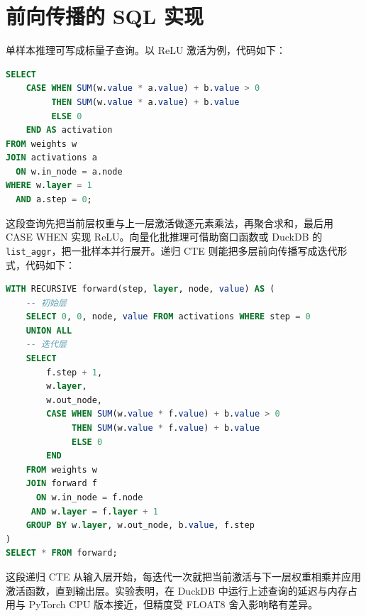 \chapter{前向传播的 SQL 实现}
单样本推理可写成标量子查询。以 ReLU 激活为例，代码如下：\par
\begin{lstlisting}[language=sql]
SELECT 
    CASE WHEN SUM(w.value * a.value) + b.value > 0 
         THEN SUM(w.value * a.value) + b.value 
         ELSE 0 
    END AS activation
FROM weights w
JOIN activations a 
  ON w.in_node = a.node 
WHERE w.layer = 1 
  AND a.step = 0;
\end{lstlisting}
这段查询先把当前层权重与上一层激活做逐元素乘法，再聚合求和，最后用 CASE WHEN 实现 ReLU。向量化批推理可借助窗口函数或 DuckDB 的 \texttt{list\_{}aggr}，把一批样本并行展开。递归 CTE 则能把多层前向传播写成迭代形式，代码如下：\par
\begin{lstlisting}[language=sql]
WITH RECURSIVE forward(step, layer, node, value) AS (
    -- 初始层
    SELECT 0, 0, node, value FROM activations WHERE step = 0
    UNION ALL
    -- 迭代层
    SELECT 
        f.step + 1,
        w.layer,
        w.out_node,
        CASE WHEN SUM(w.value * f.value) + b.value > 0 
             THEN SUM(w.value * f.value) + b.value 
             ELSE 0 
        END
    FROM weights w
    JOIN forward f 
      ON w.in_node = f.node 
     AND w.layer = f.layer + 1
    GROUP BY w.layer, w.out_node, b.value, f.step
)
SELECT * FROM forward;
\end{lstlisting}
这段递归 CTE 从输入层开始，每迭代一次就把当前激活与下一层权重相乘并应用激活函数，直到输出层。实验表明，在 DuckDB 中运行上述查询的延迟与内存占用与 PyTorch CPU 版本接近，但精度受 FLOAT8 舍入影响略有差异。\par
